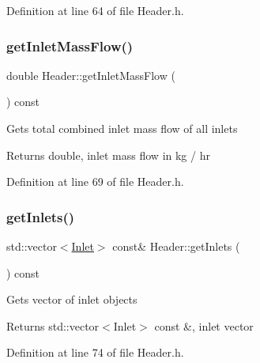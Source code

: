 Definition at line 64 of file Header.\+h.

\mbox{\label{class_header_ad572e6144481b9e9f65004aacebd701c}} 
\subsubsection{\texorpdfstring{get\+Inlet\+Mass\+Flow()}{getInletMassFlow()}}
{\footnotesize\ttfamily double Header\+::get\+Inlet\+Mass\+Flow (\begin{DoxyParamCaption}{ }\end{DoxyParamCaption}) const\hspace{0.3cm}{\ttfamily [inline]}}

Gets total combined inlet mass flow of all inlets \begin{DoxyReturn}{Returns}
double, inlet mass flow in kg / hr 
\end{DoxyReturn}


Definition at line 69 of file Header.\+h.

\mbox{\label{class_header_a625d7317488c88c949acd05c72a7c54a}} 
\subsubsection{\texorpdfstring{get\+Inlets()}{getInlets()}}
{\footnotesize\ttfamily std\+::vector$<$\hyperlink{class_inlet}{Inlet}$>$ const\& Header\+::get\+Inlets (\begin{DoxyParamCaption}{ }\end{DoxyParamCaption}) const\hspace{0.3cm}{\ttfamily [inline]}}

Gets vector of inlet objects \begin{DoxyReturn}{Returns}
std\+::vector$<$\+Inlet$>$ const \&, inlet vector 
\end{DoxyReturn}


Definition at line 74 of file Header.\+h.

\mbox{\label{class_header_af913dbf132f8cb3af6e6b374813acd93}} 

